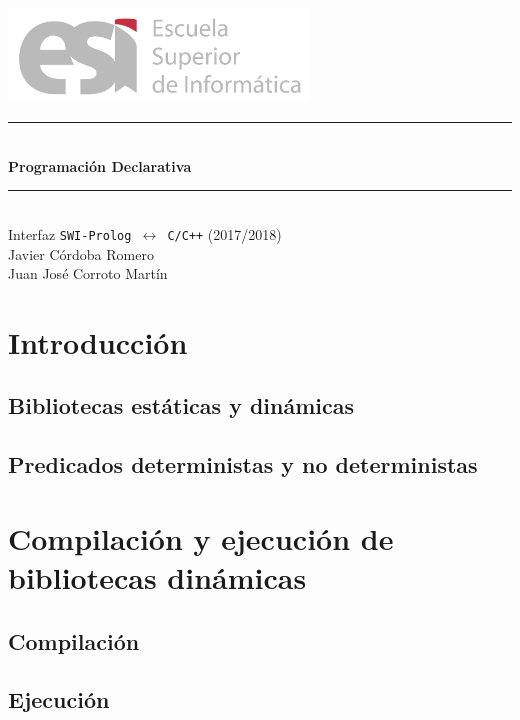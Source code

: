 \documentclass[a4paper]{article}
\begin{document}
\renewcommand{\contentsname}{Índice}

\begin{titlepage}
\begin{center}

\includegraphics[width=0.6\textwidth]{logoesi}\\[5cm]

\rule{\linewidth}{0.5mm} \\[0.4cm]
{ \huge \bfseries Programación Declarativa\\[0.4cm] }
\rule{\linewidth}{0.5mm} \\[1.5cm]
{\huge Interfaz \texttt{SWI-Prolog $\longleftrightarrow$ C/C++} (2017/2018)}\\[0.5cm]

\large{Javier Córdoba Romero}\\
\large{Juan José Corroto Martín}\\

\end{center}
\end{titlepage}

\tableofcontents
\clearpage

\section{Introducción}
\subsection{Bibliotecas estáticas y dinámicas} %
\subsection{Predicados deterministas y no deterministas}


\section{Compilación y ejecución de bibliotecas dinámicas}
\subsection{Compilación}
\subsection{Ejecución}
\end{document}
